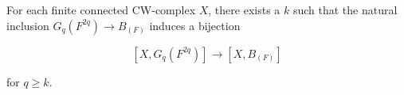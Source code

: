 For each finite connected CW-complex $X$, there exists a $k$ such that the natural inclusion $G_q(F^{2q}) \rightarrow B_{(F)}$ induces a bijection

$$[X, G_q(F^{2q})] \rightarrow [X, B_{(F)}]$$

for $q \geq k$.
